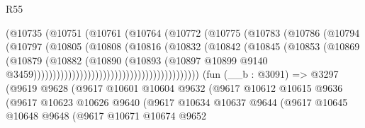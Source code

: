 \begin{lexlean}{R55}
\begin{coremodule}
                                            (@10735
                                              (@10751
                                                (@10761
                                                  (@10764
                                                    (@10772
                                                      (@10775
                                                        (@10783
                                                          (@10786
                                                            (@10794
                                                              (@10797
                                                                (@10805
                                                                  (@10808
                                                                    (@10816
                                                                      (@10832
                                                                        (@10842
                                                                          (@10845
                                                                            (@10853
                                                                              (@10869
                                                                                (@10879
                                                                                  (@10882
                                                                                    (@10890
                                                                                      (@10893
                                                                                        (@10897
                                                                                          @10899
                                                                                          @9140
                                                                                          @3459)))))))))))))))))))))))))))))))))))))))))))
    (fun (__b : @3091) =>
    @3297
      (@9619
        @9628
        (@9617
          @10601
          @10604
          @9632
          (@9617
            @10612
            @10615
            @9636
            (@9617
              @10623
              @10626
              @9640
              (@9617
                @10634
                @10637
                @9644
                (@9617
                  @10645
                  @10648
                  @9648
                  (@9617
                    @10671
                    @10674
                    @9652

\end{coremodule}
\end{lexlean}
